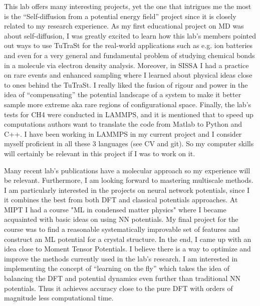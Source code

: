 \documentclass[12pt, a4paper]{awesome-cv}
\begin{document}
\begin{cvletter}
This lab offers many interesting projects, yet the one that intrigues me the most is the “Self-diffusion from a potential energy field” project since it is closely related to my research experience. As my first educational project on MD was about self-diffusion, I was greatly excited to learn how this lab's members pointed out ways to use TuTraSt for the real-world applications such as e.g. ion batteries and even for a very general and fundamental problem of studying chemical bonds in a molecule via electron density analysis. Moreover, in SISSA I had a practice on rare events and enhanced sampling where I learned about physical ideas close to ones behind the TuTraSt. I really liked the fusion of rigour and power in the idea of “compensating” the potential landscape of a system to make it better sample more extreme aka rare regions of configurational space. Finally, the lab’s tests for CH4 were conducted in LAMMPS, and it is mentioned that to speed up computations authors want to translate the code from Matlab to Python and C++. I have been working in LAMMPS in my current project and I consider myself proficient in all these 3 languages (see CV and git). So my computer skills will certainly be relevant in this project if I was to work on it.

\newpage

Many recent lab’s publications have a molecular approach so my experience will be relevant. Furthermore, I am looking forward to mastering multiscale methods. I am particularly interested in the projects on neural network potentials, since I it combines the best from both DFT and classical potentials approaches. At MIPT I had a course "ML in condensed matter physics" where I became acquainted with basic ideas on using NN potentials. My final project for the course was to find a reasonable systematically improvable set of features and construct an ML potential for a crystal structure. In the end, I came up with an idea close to Moment Tensor Potentials. I believe there is a way to optimize and improve the methods currently used in the lab's research. I am interested in implementing the concept of “learning on the fly” which takes the idea of balancing the DFT and potential dynamics even further than traditional NN potentials. Thus it achieves accuracy close to the pure DFT with orders of magnitude less computational time.


\end{cvletter}
\end{document}
